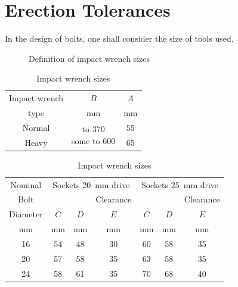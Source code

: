 \section{Erection Tolerances}
In the design of bolts, one shall consider the size of tools used.
\begin{figure}[H]
\centering\caption{Definition of impact wrench sizes \citep{ASI2016}}
\end{figure}

\begin{table}[H]
\centering\caption{Impact wrench sizes \citep{ASI2016}}
\begin{tabular}{ccc}
	\toprule
	Impact wrench &                                $B$                                &   $A$    \\
	    type      &                             \si{\mm}                              & \si{\mm} \\ \midrule
	   Normal     & \multirow{2}[0]{*}{\parbox{5cm}{\centering{}to 370\\some to 600}} &    55    \\
	    Heavy     &                                                                   &    65    \\ \bottomrule
\end{tabular}
\end{table}
\begin{table}[H]
\centering\caption{Impact wrench sizes \citep{ASI2016}}
\begin{tabular}{ccccccc}
	\toprule
	Nominal  & \multicolumn{3}{c}{Sockets \SI{20}{\mm} drive} & \multicolumn{3}{c}{Sockets \SI{25}{\mm} drive} \\
	  Bolt   &          &          &        Clearance         &          &          &        Clearance         \\
	Diameter &   $C$    &   $D$    &           $E$            &   $C$    &   $D$    &           $E$            \\
	\si{\mm} & \si{\mm} & \si{\mm} &         \si{\mm}         & \si{\mm} & \si{\mm} &         \si{\mm}         \\ \midrule
	   16    &    54    &    48    &            30            &    60    &    58    &            35            \\
	   20    &    57    &    58    &            35            &    63    &    58    &            35            \\
	   24    &    58    &    61    &            35            &    70    &    68    &            40            \\ \bottomrule
\end{tabular}
\end{table}

